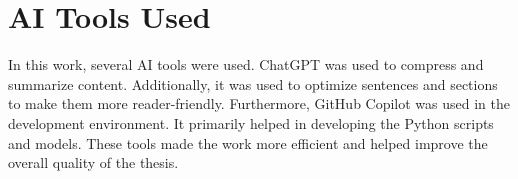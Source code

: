 \section{AI Tools Used}
\label{sec:AIToolsUsed}
In this work, several AI tools were used. ChatGPT was used to compress and summarize content. Additionally, it was used to optimize sentences and sections to make them more reader-friendly. Furthermore, GitHub Copilot was used in the development environment. It primarily helped in developing the Python scripts and models. These tools made the work more efficient and helped improve the overall quality of the thesis.
